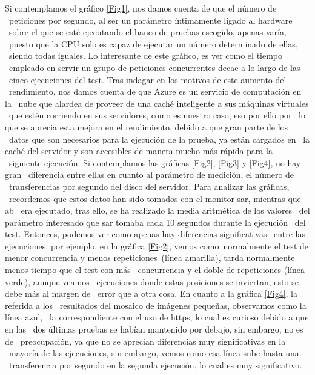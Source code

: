 \documentclass[11pt,twoside,a4paper]{book}
\begin{document}
Si contemplamos el gráfico \ref{Fig1}, nos damos cuenta de que el número de \
peticiones por segundo, al ser un parámetro íntimamente ligado al hardware \
sobre el que se esté ejecutando el banco de pruebas escogido, apenas varía, \
puesto que la CPU solo es capaz de ejecutar un número determinado de ellas, \
siendo todas iguales. Lo interesante de este gráfico, es ver como el tiempo \
empleado en servir un grupo de peticiones concurrentes decae a lo largo de las \
cinco ejecuciones del test. Tras indagar en los motivos de este aumento del \
rendimiento, nos damos cuenta de que Azure es un servicio de computación en la \
nube que alardea de proveer de una caché inteligente a sus máquinas virtuales \
que estén corriendo en sus servidores, como es nuestro caso, eso por ello por \
lo que se aprecia esta mejora en el rendimiento, debido a que gran parte de los \
datos que son necesarios para la ejecución de la prueba, ya están cargados en \
la caché del servidor y son accesibles de manera mucho más rápida para la \
siguiente ejecución. \newline \newline
\indent Si contemplamos las gráficas \ref{Fig2}, \ref{Fig3} y \ref{Fig4}, no hay gran \
diferencia entre ellas en cuanto al parámetro de medición, el número de \
transferencias por segundo del disco del servidor. Para analizar las gráficas, \
recordemos que estos datos han sido tomados con el monitor sar, mientras que ab \
era ejecutado, tras ello, se ha realizado la media aritmética de los valores \
del parámetro interesado que sar tomaba cada 10 segundos durante la ejecución \
del test. Entonces, podemos ver como apenas hay diferencias significativas \
entre las ejecuciones, por ejemplo, en la gráfica \ref{Fig2}, vemos como\
normalmente el test de menor concurrencia y menos repeticiones\
(línea amarilla), tarda normalmente menos tiempo que el test con más \
concurrencia y el doble de repeticiones (línea verde), aunque veamos \
ejecuciones donde estas posiciones se inviertan, esto se debe más al margen de \
error que a otra cosa. En cuanto a la gráfica \ref{Fig4}, la referida a los \
resultados del mosaico de imágenes pequeñas, observamos como la línea azul, \
la correspondiente con el uso de https, lo cual es curioso debido a que en las \
dos últimas pruebas se habían mantenido por debajo, sin embargo, no es de \
preocupación, ya que no se aprecian diferencias muy significativas en la \
mayoría de las ejecuciones, sin embargo, vemos como esa línea sube hasta una \
transferencia por segundo en la segunda ejecución, lo cual es muy significativo.
\end{document}
